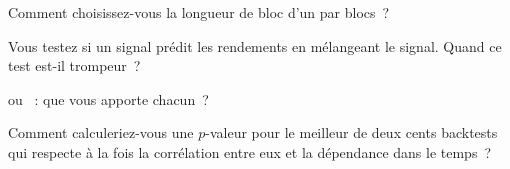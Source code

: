 \begin{interviewq}\label{iq:qm:resampling:3}
Comment choisissez-vous la longueur de bloc d'un  par blocs~?
\end{interviewq}

\begin{interviewq}\label{iq:qm:resampling:4}
Vous testez si un signal prédit les rendements en mélangeant le signal. Quand ce test est-il trompeur~?
\end{interviewq}

\begin{interviewq}\label{iq:qm:resampling:5}
 ou ~: que vous apporte chacun~?
\end{interviewq}

\begin{interviewq}\label{iq:qm:resampling:6}
Comment calculeriez-vous une $p$-valeur pour le meilleur de deux cents backtests qui respecte à la fois la corrélation entre eux et
la dépendance dans le temps~?
\end{interviewq}
